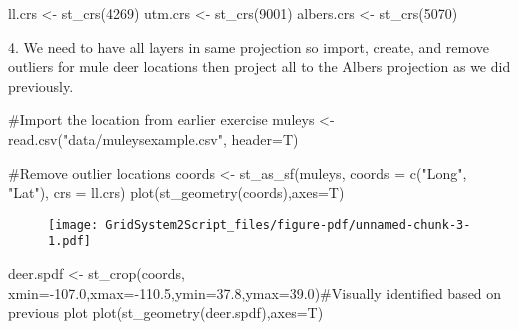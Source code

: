 \documentclass[
  letterpaper,
]{book}
\newenvironment{Shaded}{\begin{snugshade}}{\end{snugshade}}
\newcommand{\AttributeTok}[1]{\textcolor[rgb]{0.40,0.45,0.13}{#1}}
\newcommand{\CommentTok}[1]{\textcolor[rgb]{0.37,0.37,0.37}{#1}}
\newcommand{\DecValTok}[1]{\textcolor[rgb]{0.68,0.00,0.00}{#1}}
\newcommand{\FloatTok}[1]{\textcolor[rgb]{0.68,0.00,0.00}{#1}}
\newcommand{\FunctionTok}[1]{\textcolor[rgb]{0.28,0.35,0.67}{#1}}
\newcommand{\NormalTok}[1]{\textcolor[rgb]{0.00,0.23,0.31}{#1}}
\newcommand{\OtherTok}[1]{\textcolor[rgb]{0.00,0.23,0.31}{#1}}
\newcommand{\SpecialCharTok}[1]{\textcolor[rgb]{0.37,0.37,0.37}{#1}}
\newcommand{\StringTok}[1]{\textcolor[rgb]{0.13,0.47,0.30}{#1}}
\begin{document}
\begin{Shaded}
\begin{Highlighting}[]
\NormalTok{ll.crs }\OtherTok{\textless{}{-}} \FunctionTok{st\_crs}\NormalTok{(}\DecValTok{4269}\NormalTok{)}
\NormalTok{utm.crs }\OtherTok{\textless{}{-}} \FunctionTok{st\_crs}\NormalTok{(}\DecValTok{9001}\NormalTok{)}
\NormalTok{albers.crs }\OtherTok{\textless{}{-}} \FunctionTok{st\_crs}\NormalTok{(}\DecValTok{5070}\NormalTok{)}
\end{Highlighting}
\end{Shaded}

4. We need to have all layers in same projection so import, create, and
remove outliers for mule deer locations then project all to the Albers
projection as we did previously.

\begin{Shaded}
\begin{Highlighting}[]
\CommentTok{\#Import the location from earlier exercise}
\NormalTok{muleys }\OtherTok{\textless{}{-}}\FunctionTok{read.csv}\NormalTok{(}\StringTok{"data/muleysexample.csv"}\NormalTok{, }\AttributeTok{header=}\NormalTok{T)}

\CommentTok{\#Remove outlier locations}
\NormalTok{coords }\OtherTok{\textless{}{-}} \FunctionTok{st\_as\_sf}\NormalTok{(muleys, }\AttributeTok{coords =} \FunctionTok{c}\NormalTok{(}\StringTok{"Long"}\NormalTok{, }\StringTok{"Lat"}\NormalTok{), }\AttributeTok{crs =}\NormalTok{ ll.crs)}
\FunctionTok{plot}\NormalTok{(}\FunctionTok{st\_geometry}\NormalTok{(coords),}\AttributeTok{axes=}\NormalTok{T)}
\end{Highlighting}
\end{Shaded}

\begin{figure}[H]

{\centering \texttt{[image: GridSystem2Script\_files/figure-pdf/unnamed-chunk-3-1.pdf]}

}

\end{figure}

\begin{Shaded}
\begin{Highlighting}[]
\NormalTok{deer.spdf }\OtherTok{\textless{}{-}} \FunctionTok{st\_crop}\NormalTok{(coords, }\AttributeTok{xmin=}\SpecialCharTok{{-}}\FloatTok{107.0}\NormalTok{,}\AttributeTok{xmax=}\SpecialCharTok{{-}}\FloatTok{110.5}\NormalTok{,}\AttributeTok{ymin=}\FloatTok{37.8}\NormalTok{,}\AttributeTok{ymax=}\FloatTok{39.0}\NormalTok{)}\CommentTok{\#Visually identified based on previous plot}
\FunctionTok{plot}\NormalTok{(}\FunctionTok{st\_geometry}\NormalTok{(deer.spdf),}\AttributeTok{axes=}\NormalTok{T)}
\end{Highlighting}
\end{Shaded}
\end{document}
